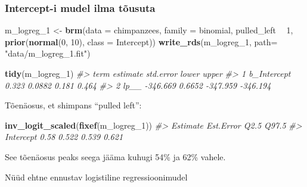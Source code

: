 \documentclass[]{book}
\newenvironment{Shaded}{\begin{snugshade}}{\end{snugshade}}
\newcommand{\KeywordTok}[1]{\textcolor[rgb]{0.13,0.29,0.53}{\textbf{#1}}}
\newcommand{\DataTypeTok}[1]{\textcolor[rgb]{0.13,0.29,0.53}{#1}}
\newcommand{\DecValTok}[1]{\textcolor[rgb]{0.00,0.00,0.81}{#1}}
\newcommand{\StringTok}[1]{\textcolor[rgb]{0.31,0.60,0.02}{#1}}
\newcommand{\CommentTok}[1]{\textcolor[rgb]{0.56,0.35,0.01}{\textit{#1}}}
\newcommand{\OperatorTok}[1]{\textcolor[rgb]{0.81,0.36,0.00}{\textbf{#1}}}
\newcommand{\NormalTok}[1]{#1}
\begin{document}
\subsubsection*{Intercept-i mudel ilma
tõusuta}\label{intercept-i-mudel-ilma-tousuta}

\begin{Shaded}
\begin{Highlighting}[]
\NormalTok{m_logreg_}\DecValTok{1}\NormalTok{ <-}\StringTok{ }\KeywordTok{brm}\NormalTok{(}\DataTypeTok{data =}\NormalTok{ chimpanzees, }
                  \DataTypeTok{family =}\NormalTok{ binomial,}
\NormalTok{                  pulled_left }\OperatorTok{~}\StringTok{ }\DecValTok{1}\NormalTok{,}
                  \KeywordTok{prior}\NormalTok{(}\KeywordTok{normal}\NormalTok{(}\DecValTok{0}\NormalTok{, }\DecValTok{10}\NormalTok{), }\DataTypeTok{class =}\NormalTok{ Intercept))}
\KeywordTok{write_rds}\NormalTok{(m_logreg_}\DecValTok{1}\NormalTok{, }\DataTypeTok{path=} \StringTok{"data/m_logreg_1.fit"}\NormalTok{)}
\end{Highlighting}
\end{Shaded}

\begin{Shaded}
\begin{Highlighting}[]
\KeywordTok{tidy}\NormalTok{(m_logreg_}\DecValTok{1}\NormalTok{)}
\CommentTok{#>          term estimate std.error    lower    upper}
\CommentTok{#> 1 b_Intercept    0.323    0.0882    0.181    0.464}
\CommentTok{#> 2        lp__ -346.669    0.6652 -347.959 -346.194}
\end{Highlighting}
\end{Shaded}

Tõenäosus, et shimpans ``pulled left'':

\begin{Shaded}
\begin{Highlighting}[]
\KeywordTok{inv_logit_scaled}\NormalTok{(}\KeywordTok{fixef}\NormalTok{(m_logreg_}\DecValTok{1}\NormalTok{))}
\CommentTok{#>           Estimate Est.Error  Q2.5 Q97.5}
\CommentTok{#> Intercept     0.58     0.522 0.539 0.621}
\end{Highlighting}
\end{Shaded}

See tõenäosus peaks seega jääma kuhugi 54\% ja 62\% vahele.

Nüüd ehtne ennustav logistiline regressioonimudel
\end{document}
